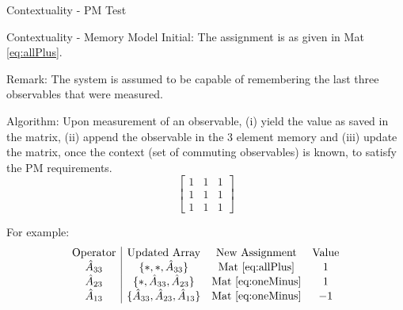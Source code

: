 \documentclass[final,hyperref={pdfpagelabels=false}]{beamer}
\newcommand{\mean}[1]{\langle #1 \rangle}
\begin{document}
\begin{frame}[t]
\begin{columns}[c]
\begin{column}{.32\textwidth}
\begin{block}{Contextuality - PM Test}


  \end{block}


  \begin{block}{Contextuality - Memory Model}
    Initial: The assignment is as given in Mat \ref{eq:allPlus}. 

    Remark: The system is assumed to be capable of remembering the last three observables that were measured. 

    Algorithm: Upon measurement of an observable, (i) yield the value as saved in the matrix, (ii) append the observable in the 3 element memory and (iii) update the matrix, once the context (set of commuting observables) is known, to satisfy the PM requirements.
    \begin{equation}\label{eq:allPlus}
\left[
    \begin{array}{ccc}
      1 & 1 & 1 \\
      1 & 1 & 1 \\
      1 & 1 & 1
    \end{array} 
\right]
    \end{equation}

    For example:
    \[
    \begin{array}{c|ccc}
      \text{Operator} & \text{Updated Array} & \text{New Assignment} & \text{Value}\\
      \hat {A}_{33} & \{*,*,\hat{A}_{33}\} & \text{Mat \ref{eq:allPlus}} & 1\\
      \hat {A}_{23} & \{*,\hat{A}_{33},\hat{A}_{23}\} & \text{Mat \ref{eq:oneMinus}} & 1\\
      \hat {A}_{13} & \{\hat{A}_{33},\hat{A}_{23},\hat {A}_{13}\} & \text{Mat \ref{eq:oneMinus}} & -1
    \end{array}
    \]


\end{block}
\end{column}
\end{columns}
\end{frame}
\end{document}
